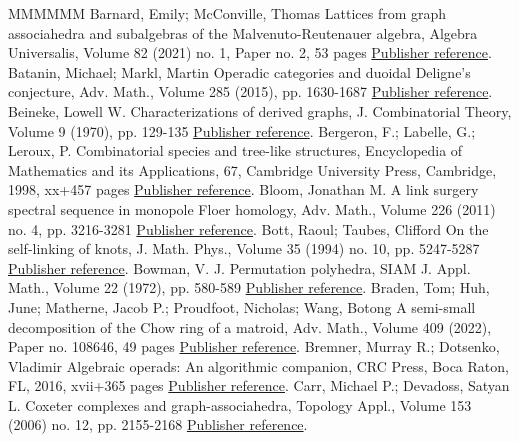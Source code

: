 \begin{thebibliography}{MMMMMM}
 Barnard, Emily; McConville, Thomas Lattices from graph associahedra and subalgebras of the Malvenuto-Reutenauer algebra, Algebra Universalis, Volume 82 (2021) no. 1, Paper no. 2, 53 pages \href{https://alco.centre-mersenne.org/articles/10.5802/alco.347/#MR4176852}{Publisher reference}.
 Batanin, Michael; Markl, Martin Operadic categories and duoidal Deligne’s conjecture, Adv. Math., Volume 285 (2015), pp. 1630-1687 \href{https://alco.centre-mersenne.org/articles/10.5802/alco.347/#MR3406537}{Publisher reference}.
 Beineke, Lowell W. Characterizations of derived graphs, J. Combinatorial Theory, Volume 9 (1970), pp. 129-135 \href{https://alco.centre-mersenne.org/articles/10.5802/alco.347/#MR262097}{Publisher reference}.
 Bergeron, F.; Labelle, G.; Leroux, P. Combinatorial species and tree-like structures, Encyclopedia of Mathematics and its Applications, 67, Cambridge University Press, Cambridge, 1998, xx+457 pages \href{https://alco.centre-mersenne.org/articles/10.5802/alco.347/#MR1629341}{Publisher reference}.
 Bloom, Jonathan M. A link surgery spectral sequence in monopole Floer homology, Adv. Math., Volume 226 (2011) no. 4, pp. 3216-3281 \href{https://alco.centre-mersenne.org/articles/10.5802/alco.347/#MR2764887}{Publisher reference}.
 Bott, Raoul; Taubes, Clifford On the self-linking of knots, J. Math. Phys., Volume 35 (1994) no. 10, pp. 5247-5287 \href{https://alco.centre-mersenne.org/articles/10.5802/alco.347/#MR1295465}{Publisher reference}.
 Bowman, V. J. Permutation polyhedra, SIAM J. Appl. Math., Volume 22 (1972), pp. 580-589 \href{https://alco.centre-mersenne.org/articles/10.5802/alco.347/#MR305800}{Publisher reference}.
 Braden, Tom; Huh, June; Matherne, Jacob P.; Proudfoot, Nicholas; Wang, Botong A semi-small decomposition of the Chow ring of a matroid, Adv. Math., Volume 409 (2022), Paper no. 108646, 49 pages \href{https://alco.centre-mersenne.org/articles/10.5802/alco.347/#MR4477425}{Publisher reference}.
 Bremner, Murray R.; Dotsenko, Vladimir Algebraic operads: An algorithmic companion, CRC Press, Boca Raton, FL, 2016, xvii+365 pages \href{https://alco.centre-mersenne.org/articles/10.5802/alco.347/#MR3642294}{Publisher reference}.
 Carr, Michael P.; Devadoss, Satyan L. Coxeter complexes and graph-associahedra, Topology Appl., Volume 153 (2006) no. 12, pp. 2155-2168 \href{https://alco.centre-mersenne.org/articles/10.5802/alco.347/#MR2239078}{Publisher reference}.

\end{thebibliography}
